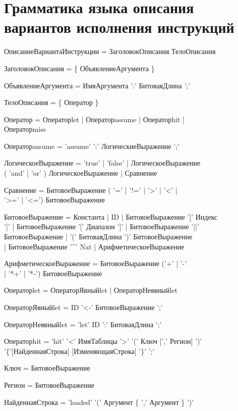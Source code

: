 \chapter{Грамматика языка описания вариантов исполнения инструкций}\label{sec:syntax}

{\tt

ОписаниеВариантаИнструкции = ЗаголовокОписания ТелоОписания

ЗаголовокОписания = \{ ОбъявлениеАргумента \}

ОбъявлениеАргумента = ИмяАргумента ':' БитоваяДлина ';'

ТелоОписания = \{ Оператор \}

Оператор = Операторlet | Операторassume | Операторhit | \\Операторmiss

Операторassume = 'assume' ':' ЛогическиеВыражение ';'

ЛогическоеВыражение = 'true' | 'false' | ЛогическоеВыражение\\ ( 'and' | 'or' ) ЛогическоеВыражение | Сравнение

Сравнение = БитовоеВыражение ( '=' | '!=' | '>' | '<' | \\ '>='  | '<=') БитовоеВыражение

БитовоеВыражение = Константа | ID | БитовоеВыражение '[' Индекс\\ ']' | БитовоеВыражение '[' Диапазон ']' | БитовоеВыражение '||' \\ БитовоеВыражение | '(' БитоваяДлина ')' БитовоеВыражение \\ | БитовоеВыражение '\^{ }' Nat | АрифметическоеВыражение

АрифметическоеВыражение = БитовоеВыражение ('+' | '-' \\ | '*+' | '*-') БитовоеВыражение

Операторlet = ОператорЯвныйlet | ОператорНеявныйlet

ОператорЯвныйlet = ID '<-' БитовоеВыражение ';'

ОператорНеявныйlet = 'let' ID ':' БитоваяДлина ';'

Операторhit = 'hit' '<' ИмяТаблицы '>' '(' Ключ [',' Регион] ')'\\ '\{'[НайденнаяСтрока] [ИзменяющаяСтрока] '\}' ';'

Ключ = БитовоеВыражение

Регион = БитовоеВыражение

НайденнаяСтрока = 'loaded' '('  Аргумент \{ ',' Аргумент \} ')'

}
